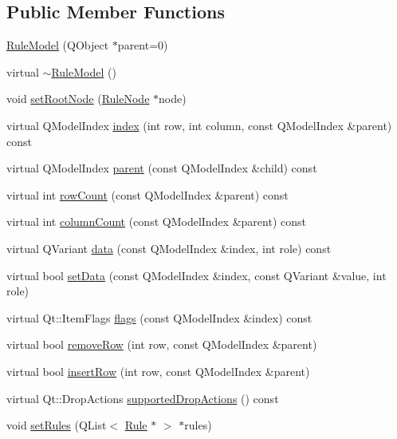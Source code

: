\subsection*{Public Member Functions}
\begin{DoxyCompactItemize}
\item 
\hyperlink{class_rule_model_a17fb8fdd3719bc5ecdeb995fc847cd11}{RuleModel} (QObject $\ast$parent=0)
\item 
virtual \hyperlink{class_rule_model_af3f4af199ff3cb6d01b26b3f4af2dac0}{$\sim$RuleModel} ()
\item 
void \hyperlink{class_rule_model_a8dc7ad7cea1f50b46904f0ea18e69915}{setRootNode} (\hyperlink{class_rule_node}{RuleNode} $\ast$node)
\item 
virtual QModelIndex \hyperlink{class_rule_model_a7a9359f3f53ada3130a757db518a6b44}{index} (int row, int column, const QModelIndex \&parent) const 
\item 
virtual QModelIndex \hyperlink{class_rule_model_a5c0fdec2621c56c9142da88a93ba27c1}{parent} (const QModelIndex \&child) const 
\item 
virtual int \hyperlink{class_rule_model_a45e7e7f2e4ba7f6e7208b49a721f9238}{rowCount} (const QModelIndex \&parent) const 
\item 
virtual int \hyperlink{class_rule_model_a29f3d819d120873a23a3a3fe9b98a885}{columnCount} (const QModelIndex \&parent) const 
\item 
virtual QVariant \hyperlink{class_rule_model_a3f673b34bcfafb3eb4b8a9d0bd697495}{data} (const QModelIndex \&index, int role) const 
\item 
virtual bool \hyperlink{class_rule_model_a4c02347af7d493bc1adf75a2fbe8bddb}{setData} (const QModelIndex \&index, const QVariant \&value, int role)
\item 
virtual Qt::ItemFlags \hyperlink{class_rule_model_a5eb6ebe9159c55cd621048b37f3f99b9}{flags} (const QModelIndex \&index) const 
\item 
virtual bool \hyperlink{class_rule_model_a3afbc8cd9f4e9d8e9ca3e0f953999612}{removeRow} (int row, const QModelIndex \&parent)
\item 
virtual bool \hyperlink{class_rule_model_a0c1562265fc38efa822301dfb50ef069}{insertRow} (int row, const QModelIndex \&parent)
\item 
virtual Qt::DropActions \hyperlink{class_rule_model_a85bbdc891917e78f1cb87c1c67b5b9c0}{supportedDropActions} () const 
\item 
void \hyperlink{class_rule_model_a0d600988571bbb79344439763c03f13d}{setRules} (QList$<$ \hyperlink{class_rule}{Rule} $\ast$ $>$ $\ast$rules)

\end{DoxyCompactItemize}

